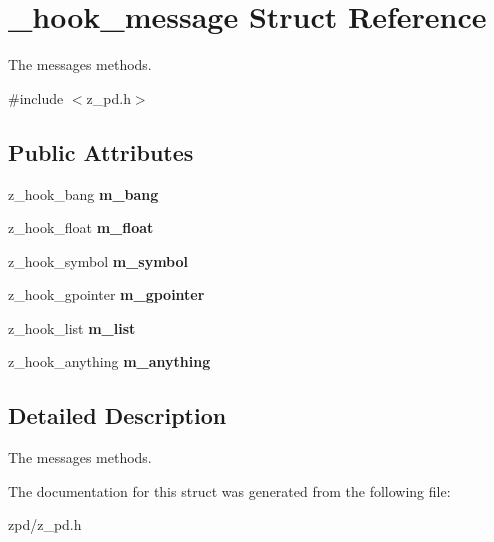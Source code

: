 \hypertarget{struct__hook__message}{\section{\-\_\-hook\-\_\-message Struct Reference}
\label{struct__hook__message}
}


The messages methods.  




{\ttfamily \#include $<$z\-\_\-pd.\-h$>$}

\subsection*{Public Attributes}
\begin{DoxyCompactItemize}
\item 
\hypertarget{struct__hook__message_acd9cd87fda71d950b2d48bded4ca9e42}{z\-\_\-hook\-\_\-bang {\bfseries m\-\_\-bang}}\label{struct__hook__message_acd9cd87fda71d950b2d48bded4ca9e42}

\item 
\hypertarget{struct__hook__message_ab73137f441b27f2dc144060a79536182}{z\-\_\-hook\-\_\-float {\bfseries m\-\_\-float}}\label{struct__hook__message_ab73137f441b27f2dc144060a79536182}

\item 
\hypertarget{struct__hook__message_acc0a01ef7c95c32ee459e35cc5f830ad}{z\-\_\-hook\-\_\-symbol {\bfseries m\-\_\-symbol}}\label{struct__hook__message_acc0a01ef7c95c32ee459e35cc5f830ad}

\item 
\hypertarget{struct__hook__message_a37a7e20df9fdbc2abfbd850d06a51347}{z\-\_\-hook\-\_\-gpointer {\bfseries m\-\_\-gpointer}}\label{struct__hook__message_a37a7e20df9fdbc2abfbd850d06a51347}

\item 
\hypertarget{struct__hook__message_add85d99fa588cb03d1aebc9461867e3b}{z\-\_\-hook\-\_\-list {\bfseries m\-\_\-list}}\label{struct__hook__message_add85d99fa588cb03d1aebc9461867e3b}

\item 
\hypertarget{struct__hook__message_ae13c161b77441046729dcb897be82ed2}{z\-\_\-hook\-\_\-anything {\bfseries m\-\_\-anything}}\label{struct__hook__message_ae13c161b77441046729dcb897be82ed2}

\end{DoxyCompactItemize}


\subsection{Detailed Description}
The messages methods. 

The documentation for this struct was generated from the following file\-:\begin{DoxyCompactItemize}
\item 
zpd/z\-\_\-pd.\-h\end{DoxyCompactItemize}
